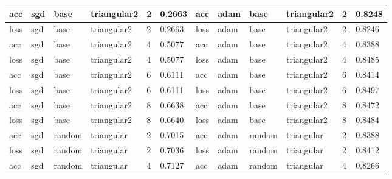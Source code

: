 \begin{table}[H]
\begin{adjustbox}{width=1\textwidth}
\begin{tabular}{|l|l|l|l|l|l||l|l|l|l|l|l|}
acc           & sgd          & base          & triangular2     & 2             & 0.2663            & acc           & adam         & base          & triangular2     & 2             & 0.8248            \\ \hline
loss          & sgd          & base          & triangular2     & 2             & 0.2663            & loss          & adam         & base          & triangular2     & 2             & 0.8246            \\ \hline
acc           & sgd          & base          & triangular2     & 4             & 0.5077            & acc           & adam         & base          & triangular2     & 4             & 0.8388            \\ \hline
loss          & sgd          & base          & triangular2     & 4             & 0.5077            & loss          & adam         & base          & triangular2     & 4             & 0.8485            \\ \hline
acc           & sgd          & base          & triangular2     & 6             & 0.6111            & acc           & adam         & base          & triangular2     & 6             & 0.8414            \\ \hline
loss          & sgd          & base          & triangular2     & 6             & 0.6111            & loss          & adam         & base          & triangular2     & 6             & 0.8497            \\ \hline
acc           & sgd          & base          & triangular2     & 8             & 0.6638            & acc           & adam         & base          & triangular2     & 8             & 0.8472            \\ \hline
loss          & sgd          & base          & triangular2     & 8             & 0.6640            & loss          & adam         & base          & triangular2     & 8             & 0.8484            \\ \hline
acc           & sgd          & random        & triangular      & 2             & 0.7015            & acc           & adam         & random        & triangular      & 2             & 0.8388            \\ \hline
loss          & sgd          & random        & triangular      & 2             & 0.7036            & loss          & adam         & random        & triangular      & 2             & 0.8412            \\ \hline
acc           & sgd          & random        & triangular      & 4             & 0.7127            & acc           & adam         & random        & triangular      & 4             & 0.8266            \\ \hline

\end{tabular}
\end{adjustbox}
\end{table}
